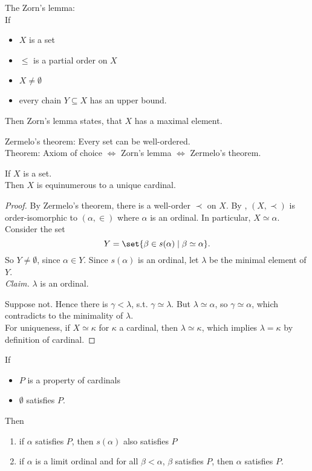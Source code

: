 \begin{recall}
    The Zorn's lemma:\\
    If 
    \begin{itemize}
        \item $X$ is a set
        \item $\leq$ is a partial order on $X$
        \item $X \ne \emptyset$
        \item every chain $Y \subseteq X$ has an upper bound.
    \end{itemize}
    Then Zorn's lemma states, that $X$ has a maximal element.
\end{recall}

\begin{recall}
    Zermelo's theorem: Every set can be well-ordered.\\
    Theorem: Axiom of choice $\iff$ Zorn's lemma $\iff$ Zermelo's theorem.
\end{recall}

\begin{proposition}
    If $X$ is a set.\\
    Then $X$ is equinumerous to a unique cardinal.
\end{proposition}
\begin{proof}
    By Zermelo's theorem, there is a well-order $\prec$ on $X$. By , $(X, \prec)$ is order-isomorphic to $(\alpha, \in)$
    where $\alpha$ is an ordinal. In particular, $X \simeq \alpha$.\\
    Consider the set $$ Y = \set{\beta \in s(\alpha) \mid \beta \simeq \alpha}.$$
    So $Y \ne \emptyset$, since $\alpha \in Y$. Since $s(\alpha)$ is an ordinal, let $\lambda$ be the minimal element of $Y$.\\
    \emph{Claim.} $\lambda$ is an ordinal.

    Suppose not. Hence there is $\gamma < \lambda$, s.t. $\gamma \simeq \lambda$. 
    But $\lambda \simeq \alpha$, so $\gamma \simeq \alpha$, which contradicts to the minimality of $\lambda$.\\
    For uniqueness, if $X \simeq \kappa$ for $\kappa$ a cardinal, then $\lambda \simeq \kappa$, which implies $\lambda = \kappa$ by definition of cardinal.
\end{proof}

\begin{theorem}
    If
    \begin{itemize}
        \item $P$ is a property of cardinals
        \item $\emptyset$ satisfies $P$.
    \end{itemize}
    Then 
    \begin{enumerate}[label=\arabic*)]
        \item if $\alpha$ satisfies $P$, then $s(\alpha)$ also satisfies $P$
        \item if $\alpha$ is a limit ordinal and for all $\beta < \alpha$, $\beta$ satisfies $P$, then
        $\alpha$ satisfies $P$.
    \end{enumerate}
\end{theorem}

